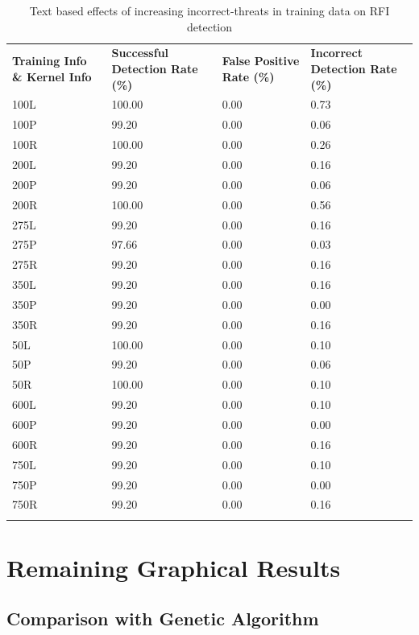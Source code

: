 \begin{appendices}
\begin{longtable}{|p{1.5in}|p{1in}|p{1in}|p{1in}|}
	\hline
	\textbf{Training Info \& Kernel Info} & \textbf{Successful Detection Rate (\%)} & \textbf{False Positive Rate (\%)} & \textbf{Incorrect Detection Rate (\%)}  \\
	\hhline{|=|=|=|=|}
	100L & 100.00 &  0.00 & 0.73 \\ \hline
	100P &  99.20 &  0.00 & 0.06 \\ \hline
	100R & 100.00 &  0.00 & 0.26 \\ \hline
	200L &  99.20 &  0.00 & 0.16 \\ \hline
	200P &  99.20 &  0.00 & 0.06 \\ \hline
	200R & 100.00 &  0.00 & 0.56 \\ \hline
	275L &  99.20 &  0.00 & 0.16 \\ \hline
	275P &  97.66 &  0.00 & 0.03 \\ \hline
	275R &  99.20 &  0.00 & 0.16 \\ \hline
	350L &  99.20 &  0.00 & 0.16 \\ \hline
	350P &  99.20 &  0.00 & 0.00 \\ \hline
	350R &  99.20 &  0.00 & 0.16 \\ \hline
	 50L & 100.00 &  0.00 & 0.10 \\ \hline
	 50P &  99.20 &  0.00 & 0.06 \\ \hline
	 50R & 100.00 &  0.00 & 0.10 \\ \hline
	600L &  99.20 &  0.00 & 0.10 \\ \hline
	600P &  99.20 &  0.00 & 0.00 \\ \hline
	600R &  99.20 &  0.00 & 0.16 \\ \hline
	750L &  99.20 &  0.00 & 0.10 \\ \hline
	750P &  99.20 &  0.00 & 0.00 \\ \hline
	750R &  99.20 &  0.00 & 0.16 \\ \hline
	\caption{Text based effects of increasing incorrect-threats in training data on RFI detection}
\end{longtable}

\newpage
\section{Remaining Graphical Results}
\subsection{Comparison with Genetic Algorithm} \label{app:resComparison}


\end{appendices}
